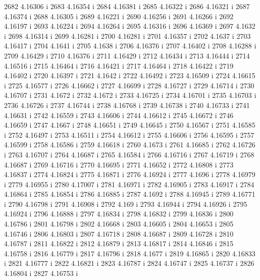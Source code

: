  2682  4.16306  i
 2683  4.16354  i
 2684  4.16381  i
 2685  4.16322  i
 2686  4.16321  i
 2687  4.16374  i
 2688  4.16305  i
 2689  4.16221  i
 2690  4.16256  i
 2691  4.16266  i
 2692  4.16197  i
 2693  4.16224  i
 2694  4.16264  i
 2695  4.16316  i
 2696  4.16369  i
 2697  4.1632  i
 2698  4.16314  i
 2699  4.16281  i
 2700  4.16281  i
 2701  4.16357  i
 2702  4.1637  i
 2703  4.16417  i
 2704  4.1641  i
 2705  4.1638  i
 2706  4.16376  i
 2707  4.16402  i
 2708  4.16288  i
 2709  4.16429  i
 2710  4.16376  i
 2711  4.16429  i
 2712  4.16434  i
 2713  4.16444  i
 2714  4.16516  i
 2715  4.16464  i
 2716  4.16421  i
 2717  4.16464  i
 2718  4.16422  i
 2719  4.16402  i
 2720  4.16397  i
 2721  4.1642  i
 2722  4.16492  i
 2723  4.16509  i
 2724  4.16615  i
 2725  4.16577  i
 2726  4.16662  i
 2727  4.16699  i
 2728  4.16727  i
 2729  4.16714  i
 2730  4.16707  i
 2731  4.1672  i
 2732  4.1672  i
 2733  4.16725  i
 2734  4.16701  i
 2735  4.16703  i
 2736  4.16726  i
 2737  4.16744  i
 2738  4.16768  i
 2739  4.16738  i
 2740  4.16733  i
 2741  4.16631  i
 2742  4.16559  i
 2743  4.16606  i
 2744  4.16612  i
 2745  4.16672  i
 2746  4.16659  i
 2747  4.1667  i
 2748  4.16651  i
 2749  4.16645  i
 2750  4.16567  i
 2751  4.16585  i
 2752  4.16497  i
 2753  4.16511  i
 2754  4.16612  i
 2755  4.16606  i
 2756  4.16595  i
 2757  4.16599  i
 2758  4.16586  i
 2759  4.16618  i
 2760  4.1673  i
 2761  4.16685  i
 2762  4.16726  i
 2763  4.16707  i
 2764  4.16687  i
 2765  4.16584  i
 2766  4.16716  i
 2767  4.16719  i
 2768  4.16687  i
 2769  4.16716  i
 2770  4.16695  i
 2771  4.16652  i
 2772  4.16808  i
 2773  4.16837  i
 2774  4.16824  i
 2775  4.16871  i
 2776  4.16924  i
 2777  4.1696  i
 2778  4.16979  i
 2779  4.16955  i
 2780  4.17007  i
 2781  4.16971  i
 2782  4.16905  i
 2783  4.16917  i
 2784  4.16864  i
 2785  4.16854  i
 2786  4.16885  i
 2787  4.1692  i
 2788  4.16945  i
 2789  4.16771  i
 2790  4.16798  i
 2791  4.16908  i
 2792  4.169  i
 2793  4.16944  i
 2794  4.16926  i
 2795  4.16924  i
 2796  4.16888  i
 2797  4.16834  i
 2798  4.16832  i
 2799  4.16836  i
 2800  4.16786  i
 2801  4.16798  i
 2802  4.16668  i
 2803  4.16605  i
 2804  4.16653  i
 2805  4.16746  i
 2806  4.16803  i
 2807  4.16718  i
 2808  4.16687  i
 2809  4.16728  i
 2810  4.16787  i
 2811  4.16822  i
 2812  4.16879  i
 2813  4.16817  i
 2814  4.16846  i
 2815  4.16758  i
 2816  4.16779  i
 2817  4.16796  i
 2818  4.1677  i
 2819  4.16865  i
 2820  4.16833  i
 2821  4.16777  i
 2822  4.16821  i
 2823  4.16787  i
 2824  4.16747  i
 2825  4.16737  i
 2826  4.16804  i
 2827  4.16753  i
